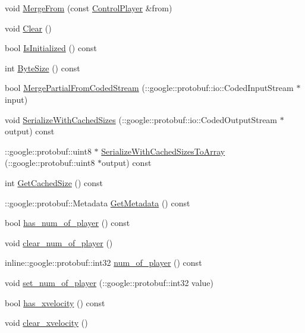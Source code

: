 \begin{DoxyCompactItemize}
\item 
void \hyperlink{class_control_player_a7c875ed4b63747d865fb668b50ef7b50}{Merge\-From} (const \hyperlink{class_control_player}{Control\-Player} \&from)
\item 
void \hyperlink{class_control_player_a691b54dd8fd3532aa7cb76b84ed85cd5}{Clear} ()
\item 
bool \hyperlink{class_control_player_af517c65f7b59b1c11135d462d3df655c}{Is\-Initialized} () const 
\item 
int \hyperlink{class_control_player_a67b9268037ffaa3b2403fe0539069a4f}{Byte\-Size} () const 
\item 
bool \hyperlink{class_control_player_adc67bdb8e86fdd28c772e3291218e81b}{Merge\-Partial\-From\-Coded\-Stream} (\-::google\-::protobuf\-::io\-::\-Coded\-Input\-Stream $\ast$input)
\item 
void \hyperlink{class_control_player_a3f100d88daae100fdbae3ee409fd2359}{Serialize\-With\-Cached\-Sizes} (\-::google\-::protobuf\-::io\-::\-Coded\-Output\-Stream $\ast$output) const 
\item 
\-::google\-::protobuf\-::uint8 $\ast$ \hyperlink{class_control_player_a95c6688447829b02a72265eabe54abdb}{Serialize\-With\-Cached\-Sizes\-To\-Array} (\-::google\-::protobuf\-::uint8 $\ast$output) const 
\item 
int \hyperlink{class_control_player_a286ce6080af5efae2c5769d8904a0d9a}{Get\-Cached\-Size} () const 
\item 
\-::google\-::protobuf\-::\-Metadata \hyperlink{class_control_player_a6b3b68636b9e666518c5b8c6411bc6cb}{Get\-Metadata} () const 
\item 
bool \hyperlink{class_control_player_ad9ba495fb6558cb8bcd24be096cbdefa}{has\-\_\-num\-\_\-of\-\_\-player} () const 
\item 
void \hyperlink{class_control_player_a24c464ffc2da4acaae33a52e31a1f053}{clear\-\_\-num\-\_\-of\-\_\-player} ()
\item 
inline\-::google\-::protobuf\-::int32 \hyperlink{class_control_player_ac2838f802a27d8c3cde6aae50aa1beb1}{num\-\_\-of\-\_\-player} () const 
\item 
void \hyperlink{class_control_player_ac6572d26fc4233c40b9194c16fd9a7b4}{set\-\_\-num\-\_\-of\-\_\-player} (\-::google\-::protobuf\-::int32 value)
\item 
bool \hyperlink{class_control_player_a7b7924fb3150a0185246e9586715f69e}{has\-\_\-xvelocity} () const 
\item 
void \hyperlink{class_control_player_afb00a137d204116ef3e2ad739e1784e1}{clear\-\_\-xvelocity} ()

\end{DoxyCompactItemize}
